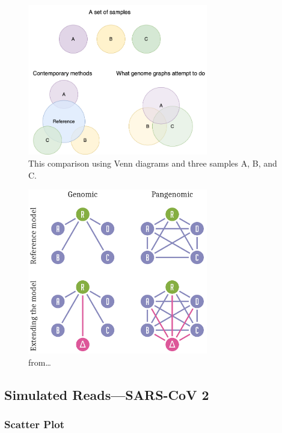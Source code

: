 \documentclass[a4paper]{article}
\begin{document}
\begin{figure}
\centering
\includegraphics[width=0.7\textwidth]{figures/All-versus-All-Comparison.png}
\caption{\label{fig:orgc92a02e}
This comparison using Venn diagrams and three samples A, B, and C.}
\end{figure}


\begin{figure}
\centering
\includegraphics[width=0.7\textwidth]{figures/ekg-all-vs-all.png}
\caption{\label{fig:org5e6a3bf}
from\ldots{}}
\end{figure}

\subsection{Simulated Reads—SARS-CoV 2}
\label{sec:org8e1baec}
\subsubsection{Scatter Plot}
\label{sec:org9ec087e}
\end{document}
